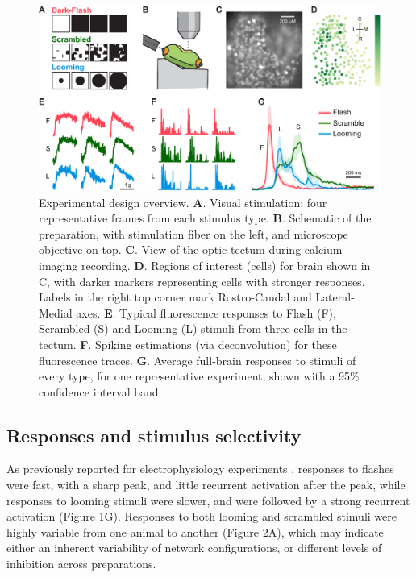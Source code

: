 \documentclass{article}
\begin{document}
\begin{figure}[t!]
\includegraphics[width=\linewidth]{fig1.pdf}
\caption{
Experimental design overview. \textbf{A}. Visual stimulation: four representative frames from each stimulus type. \textbf{B}. Schematic of the preparation, with stimulation fiber on the left, and microscope objective on top. \textbf{C}. View of the optic tectum during calcium imaging recording. \textbf{D}. Regions of interest (cells) for brain shown in C, with darker markers representing cells with stronger responses. Labels in the right top corner mark Rostro-Caudal and Lateral-Medial axes. \textbf{E}. Typical fluorescence responses to Flash (F), Scrambled (S) and Looming (L) stimuli from three cells in the tectum. \textbf{F}. Spiking estimations (via deconvolution) for these fluorescence traces. \textbf{G}. Average full-brain responses to stimuli of every type, for one representative experiment, shown with a 95\% confidence interval band. }
\end{figure}

\subsection*{Responses and stimulus selectivity}

As previously reported for electrophysiology experiments \citep{khakhalin2014}, responses to flashes were fast, with a sharp peak, and little recurrent activation after the peak, while responses to looming stimuli were slower, and were followed by a strong recurrent activation (Figure 1G). Responses to both looming and scrambled stimuli were highly variable from one animal to another (Figure 2A), which may indicate either an inherent variability of network configurations, or different levels of inhibition across preparations.
\end{document}
